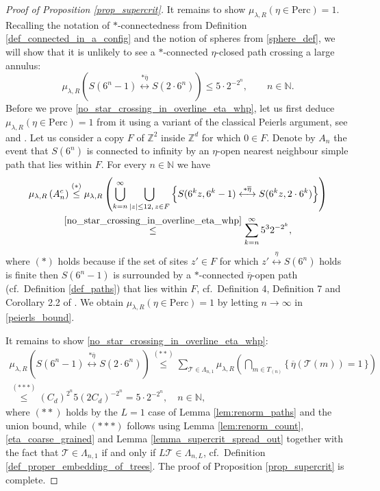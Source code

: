 \documentclass[a4paper,12pt]{article}
\begin{document}
\begin{proof}[Proof of Proposition \ref{prop_supercrit}]
It remains to show $\mu_{\lambda,R}( \eta \in \mathrm{Perc})=1$. Recalling the notation of $*$-connectedness from Definition \ref{def_connected_in_a_config} and the notion of spheres from \eqref{sphere_def}, we will show that
it is unlikely to see a $*$-connected $\eta$-closed path crossing a large annulus:
\begin{equation}\label{no_star_crossing_in_overline_eta_whp}
\mu_{\lambda,R} \left( S(6^n-1) \stackrel{*\overline{\eta}}{ \longleftrightarrow} S(2 \cdot 6^n)   \right) \leq 5 \cdot 2^{-2^n}, \qquad n \in \mathbb{N}.
\end{equation}
Before we prove \eqref{no_star_crossing_in_overline_eta_whp}, let us first deduce $\mu_{\lambda,R}( \eta \in \mathrm{Perc})=1$ from it
using a variant of the classical Peierls argument, see \cite{Pei36} and \cite[Section 1.4]{Gr99}.
Let us consider a copy $F$ of $\mathbb{Z}^2$ inside $\mathbb{Z}^d$ for which $0 \in F$. Denote by $A_n$ the event that  $S(6^n)$ is connected to infinity by
an $\eta$-open nearest neighbour simple path that lies within $F$.
For every $n \in \mathbb{N}$ we have
\begin{multline}\label{peierls_bound}
\mu_{\lambda,R} \left( A_n^c  \right) \stackrel{(*)}{\leq}
\mu_{\lambda,R}\left( \bigcup_{k=n}^{\infty} \bigcup_{|z|\leq 12,\, z \in F} \left\{   S(6^k z ,6^k-1) \stackrel{*\overline{\eta}}{\longleftrightarrow} S(6^k z ,2 \cdot 6^k)   \right\}  \right) \\
\stackrel{\eqref{no_star_crossing_in_overline_eta_whp}}{\leq}  \sum_{k=n}^\infty 5^3  2^{-2^k},
\end{multline}
where $(*)$ holds because if the set of sites $z' \in F$ for which $z' \stackrel{\eta}{\longleftrightarrow} S(6^n)$ holds  is finite then $S(6^n-1)$ is surrounded by a $*$-connected $\overline{\eta}$-open path (cf.\
Definition \ref{def_paths}) that lies within $F$, cf.\   Definition 4, Definition 7 and Corollary 2.2 of \cite{Kesten82}.
We obtain $\mu_{\lambda,R}( \eta \in \mathrm{Perc})=1$ by letting $n \to \infty$ in \eqref{peierls_bound}.

It remains to show \eqref{no_star_crossing_in_overline_eta_whp}:
\begin{multline}
\mu_{\lambda,R} \left( S(6^n-1) \stackrel{*\overline{\eta}}{ \longleftrightarrow} S(2 \cdot 6^n)   \right)
\stackrel{(**)}{\leq} \sum_{\mathcal{T} \in \Lambda_{n,1} } \mu_{\lambda,R}\left( \bigcap_{m \in T_{(n)}} \{\, \overline{\eta}(\mathcal{T}(m))=1\, \}  \right)
 \\
 \stackrel{(***)}{\leq}
 (C_d)^{2^n} 5 \left( 2 C_d  \right)^{-2^n}= 5 \cdot 2^{-2^n}, \quad n \in \mathbb{N},
\end{multline}
where $(**)$ holds by the $L=1$ case of Lemma \ref{lem:renorm_paths} and the union bound,
while $(***)$ follows using Lemma \ref{lem:renorm_count}, \eqref{eta_coarse_grained} and Lemma \ref{lemma_supercrit_spread_out} together with the fact that $\mathcal{T} \in \Lambda_{n,1}$
if and only if $L\mathcal{T} \in \Lambda_{n,L}$, cf.\ Definition \ref{def_proper_embedding_of_trees}. The proof of Proposition \ref{prop_supercrit} is complete.
\end{proof}
\end{document}
